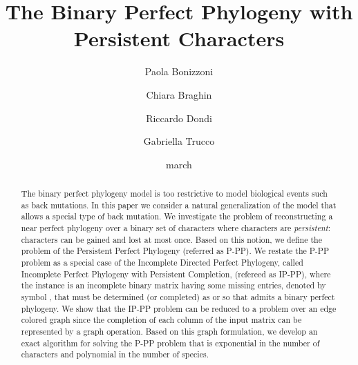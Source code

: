 \documentclass{llncs}
\begin{document}
\title{The Binary Perfect Phylogeny with Persistent Characters}
\author{Paola Bonizzoni \and Chiara Braghin  \and Riccardo Dondi \and Gabriella Trucco 
}


\pagestyle{plain}
\date{march}\maketitle



\begin{abstract}
The  binary perfect phylogeny model is too restrictive to model  biological events such as back mutations. In this paper we consider a  natural generalization of the  model that allows a special type of back mutation.  We investigate the  problem of reconstructing  a  near perfect phylogeny over a binary set of characters where   characters are {\em persistent}:
 characters  can be  gained and lost at most once. Based on this notion, we define the problem of  the Persistent Perfect Phylogeny (referred as P-PP). 
We restate the P-PP problem  as a special case of the Incomplete Directed Perfect Phylogeny,  called Incomplete  Perfect Phylogeny with Persistent Completion, (refereed as IP-PP),  where the instance is an incomplete binary matrix   having some missing entries, denoted by symbol , that must be determined (or completed) as  or  so that   admits a binary perfect phylogeny.
We show that the IP-PP problem can be reduced to a problem over an edge colored graph since the  completion of  each column of the input  matrix  can be  represented by a graph operation. 
  Based on this graph formulation,  we develop  an exact algorithm  for solving  the P-PP problem that is exponential in the number of characters and polynomial in the number of species. 
\end{abstract}
\end{document}
